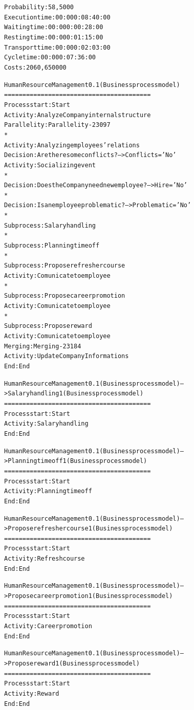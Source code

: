 \begin{alltt}
Probability:   58,5000%
Execution time:  00:000:08:40:00
Waiting time:  00:000:00:28:00
Resting time:  00:000:01:15:00
Transport time:  00:000:02:03:00
Cycle time:  00:000:07:36:00
Costs:  2060,650000

Human Resource Management 0.1 (Business process model)
========================================
Process start: Start
Activity: Analyze Company internal structure
Parallelity: Parallelity-23097
    *
    Activity: Analyzing employees' relations
    Decision: Are there some conflicts? --> Conflicts='No'
    Activity: Socializing event
    *
    Decision: Does the Company need new employee? --> Hire = 'No'
    *
    Decision: Is an employee problematic? --> Problematic='No'
    *
    Subprocess: Salary handling
    *
    Subprocess: Planning time off
    *
    Subprocess: Propose refresher course
    Activity: Comunicate to employee
    *
    Subprocess: Propose career promotion
    Activity: Comunicate to employee
    *
    Subprocess: Propose reward
    Activity: Comunicate to employee
Merging: Merging-23184
Activity: Update Company Informations
End: End

Human Resource Management 0.1 (Business process model) --> Salary handling 1 (Business process model)
========================================
Process start: Start
Activity: Salary handling
End: End

Human Resource Management 0.1 (Business process model) --> Planning time off 1 (Business process model)
========================================
Process start: Start
Activity: Planning time off
End: End

Human Resource Management 0.1 (Business process model) --> Propose refresher course 1 (Business process model)
========================================
Process start: Start
Activity: Refresh course
End: End

Human Resource Management 0.1 (Business process model) --> Propose career promotion 1 (Business process model)
========================================
Process start: Start
Activity: Career promotion
End: End

Human Resource Management 0.1 (Business process model) --> Propose reward 1 (Business process model)
========================================
Process start: Start
Activity: Reward
End: End
\end{alltt}


